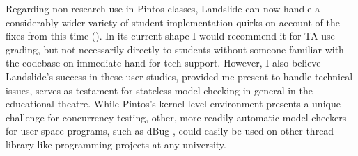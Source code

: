 Regarding non-research use in Pintos classes,
Landslide can now handle a considerably wider variety of student implementation quirks
on account of the fixes from this time (\sect{\ref{sec:education-pintos-instrumentation}}).
In its current shape I would recommend it for TA use grading,
but not necessarily directly to students without someone familiar with the codebase on immediate hand for tech support.
However, I also believe Landslide's success in these user studies,
provided me present to handle technical issues,
serves as testament for stateless model checking in general in the educational theatre.
While Pintos's kernel-level environment presents a unique challenge for concurrency testing,
other, more readily automatic model checkers for user-space programs,
such as dBug \cite{dbug-ssv},
could easily be used on other thread-library-like programming projects at any university.

